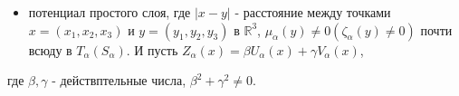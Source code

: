 \documentclass[10pt]{article}
\begin{document}
\begin{itemize}

  \item потенциал простого слоя, где $|x-y|$ - расстояние между точками $x=\left(x_{1}, x_{2}, x_{3}\right)$ и $y=\left(y_{1}, y_{2}, y_{3}\right)$ в $\mathbb{R}^{3}$, $\mu_{\alpha}(y) \neq 0\left(\zeta_{\alpha}(y) \neq 0\right)$ почти всюду в $T_{\alpha}\left(S_{\alpha}\right)$. И пусть $Z_{\alpha}(x)=\beta U_{\alpha}(x)+\gamma V_{\alpha}(x)$,

\end{itemize}



где $\beta, \gamma$ - действптельные числа, $\beta^{2}+\gamma^{2} \neq 0$.
\end{document}
